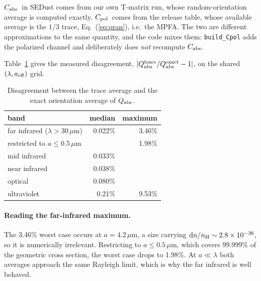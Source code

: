 \documentclass{my_memo}
\newcommand{\code}[1]{\texttt{#1}}
\newcommand{\um}{\ensuremath{\,\mu\mathrm{m}}}
\newcommand{\Cabs}{\ensuremath{C_{\rm abs}}}
\newcommand{\Cpol}{\ensuremath{C_{\rm pol}}}
\begin{document}
\Cabs\ in SEDust comes from our own T-matrix run, whose random-orientation
average is computed exactly. \Cpol\ comes from the release table, whose
available average is the $1/3$ trace, Eq.~(\ref{eq:qran}), i.e.\ the MPFA. The
two are different approximations to the same quantity, and the code mixes them:
\code{build\_Cpol} adds the polarized channel and deliberately does \emph{not}
recompute \Cabs.

Table~\ref{tab:mixed} gives the measured disagreement,
$|Q_{\rm abs}^{\rm trace}/Q_{\rm abs}^{\rm exact}-1|$, on the shared
$(\lambda, a_{\rm eff})$ grid.

\begin{table}[h]
\centering
\begin{tabular}{@{}lrr@{}}
\toprule
band & median & maximum \\
\midrule
far infrared ($\lambda > 30\um$)     & 0.022\% & 3.46\% \\
\quad restricted to $a \le 0.5\um$   &         & 1.98\% \\
mid infrared                         & 0.033\% &        \\
near infrared                        & 0.038\% &        \\
optical                              & 0.080\% &        \\
ultraviolet                          & 0.21\%  & 9.53\% \\
\bottomrule
\end{tabular}
\caption{Disagreement between the trace average and the exact
orientation average of $Q_{\rm abs}$.}
\label{tab:mixed}
\end{table}

\paragraph{Reading the far-infrared maximum.} The 3.46\% worst case occurs at
$a = 4.2\um$, a size carrying ${\rm d}n/n_{\rm H} \sim 2.8\times10^{-36}$, so
it is numerically irrelevant. Restricting to $a \le 0.5\um$, which covers
99.999\% of the geometric cross section, the worst case drops to 1.98\%.
At $a \ll \lambda$ both averages approach the same Rayleigh limit, which is why
the far infrared is well behaved.
\end{document}
